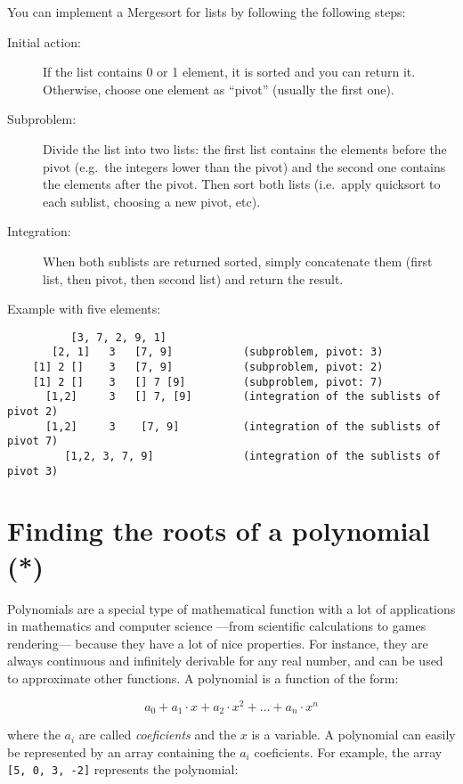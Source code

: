 \documentclass{article}
\begin{document}
You can implement a Mergesort for lists
by following the following steps: 

\begin{description}
\item[Initial action: ] If the list contains 0 or 1 element, it is
  sorted and you can return it. Otherwise, choose one element as
  ``pivot'' (usually the first one). 
\item[Subproblem: ] Divide the
  list into two lists: the first list contains the elements before the
  pivot (e.g.~the integers lower than the pivot) and the second one
  contains the elements after the pivot. Then sort both lists
  (i.e.~apply quicksort to each sublist, choosing a new pivot, etc).
\item[Integration: ] When both sublists are returned sorted,
  simply concatenate them (first list, then pivot, then second list)
  and return the result.
\end{description}

Example with five elements: 

\begin{verbatim}
          [3, 7, 2, 9, 1]            
       [2, 1]   3   [7, 9]           (subproblem, pivot: 3)
    [1] 2 []    3   [7, 9]           (subproblem, pivot: 2)   
    [1] 2 []    3   [] 7 [9]         (subproblem, pivot: 7)
      [1,2]     3   [] 7, [9]        (integration of the sublists of pivot 2)
      [1,2]     3    [7, 9]          (integration of the sublists of pivot 7)
         [1,2, 3, 7, 9]              (integration of the sublists of pivot 3)
\end{verbatim}

\section{Finding the roots of a polynomial (*)}
\label{sec:find-roots-polyn}

Polynomials are a special type of mathematical function with a lot of
applications in mathematics and computer science ---from scientific
calculations to games rendering--- because they have a lot of nice
properties. For instance, they are always continuous and infinitely
derivable for any real number, and can be used to approximate other
functions. A polynomial is a function of the form:

$$ a_0 + a_1 \cdot x + a_2 \cdot x^2 + \ldots + a_n \cdot x^n $$ 

where the $a_i$ are called \emph{coeficients} and the $x$ is a variable. A
polynomial can easily be represented by an array containing the $a_i$
coeficients. For example, the array \verb+[5, 0, 3, -2]+ represents
the polynomial: 
\end{document}
